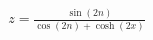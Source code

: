 \documentclass[preview]{standalone}
\begin{document}
\begin{align*}
z = \frac{\sin(2n)}{\cos(2n)+\cosh(2x)}
\end{align*}
\end{document}

